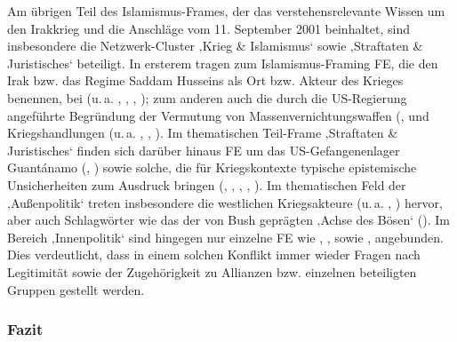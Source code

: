 Am übrigen Teil des Islamismus-Frames, der das verstehensrelevante Wissen um den Irakkrieg und die Anschläge vom 11. September 2001 beinhaltet, sind insbesondere die Netzwerk-Cluster ‚Krieg \& Islamismus` sowie ‚Straftaten \& Juristisches` beteiligt. In ersterem tragen zum Islamismus-Framing FE, die den Irak bzw. das Regime Saddam Husseins als Ort bzw. Akteur des Krieges benennen, bei (u.\,a. , , , ); zum anderen auch die durch die US-Regierung angeführte Begründung der Vermutung von Massenvernichtungswaffen (,  und Kriegshandlungen (u.\,a. , , ). Im thematischen Teil-Frame ‚Straftaten \& Juristisches` finden sich darüber hinaus FE um das US-Gefangenenlager Guantánamo (, ) sowie solche, die für Kriegskontexte typische epistemische Unsicherheiten zum Ausdruck bringen (, , , , ). Im thematischen Feld der ‚Außenpolitik` treten insbesondere die westlichen Kriegsakteure (u.\,a. , ) hervor, aber auch Schlagwörter wie das der von Bush geprägten ‚Achse des Bösen` (). Im Bereich ‚Innenpolitik` sind hingegen nur einzelne FE wie , ,  sowie ,  angebunden. Dies verdeutlicht, dass in einem solchen Konflikt immer wieder Fragen nach Legitimität sowie der Zugehörigkeit zu Allianzen bzw. einzelnen beteiligten Gruppen gestellt werden.

\subsubsection{Fazit}\label{fazit-1}

